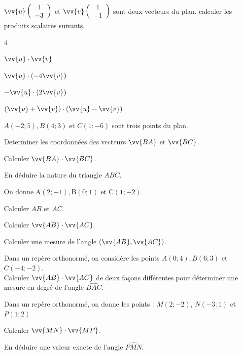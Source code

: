 \documentclass[11pt,a4paper]{article}  %
\begin{document}
\exercice{}
$\vv{u}\left(\begin{array}{c}1 \\ -3\end{array}\right)$ et $\vv{v}\left(\begin{array}{c}1 \\ -1\end{array}\right)$ sont deux vecteurs du plan. calculer les produits scalaires suivants.
\begin{multicols}{4}
\begin{enumMet}
	\item $\vv{u} \cdot \vv{v}$
	\item $\vv{u} \cdot(-4 \vv{v})$
	\item $-\vv{u} \cdot(2 \vv{v})$
	\item $(\vv{u}+\vv{v}) \cdot(\vv{u}-\vv{v})$
\end{enumMet}
\end{multicols}

\exercice{}
$A(-2 ; 5), B(4 ; 3)$ et $C(1 ;-6)$ sont trois points du plan.
\begin{enumMet}
	\item Determiner les coordonnées des vecteurs $\vv{B A}$ et $\vv{B C}$.
	\item Calculer $\vv{B A} \cdot \vv{B C}$.
	\item En déduire la nature du triangle $A B C$.
\end{enumMet}

\exercice{}
On donne $\mathrm{A}(2 ;-1), \mathrm{B}(0 ; 1)$ et $\mathrm{C}(1 ;-2)$.
\begin{enumMet}
	\item Calculer $A B$ et $A C$.
	\item Calculer $\vv{AB} \cdot \vv{AC}$.
	\item Calculer une mesure de l'angle $(\vv{AB}, \vv{AC})$.
\end{enumMet}

\exercice{}
Dans un repère orthonormé, on considère les points $A(0 ; 4), B(6 ; 3)$ et $C(-4 ;-2)$.\\
Calculer $\vv{A B} \cdot \vv{A C}$ de deux façons différentes pour déterminer une mesure en degré de l'angle $\widehat{B A C}$.

\exercice{}
Dans un repère orthonormé, on donne les points : $M(2;-2)$, $N(-3;1)$ et $P(1;2)$
\begin{enumMet}
	\item Calculer $\vv{M N} \cdot \vv{M P}$.
	\item En déduire une valeur exacte de l'angle $\widehat{P M N}$.
\end{enumMet}
\end{document}
